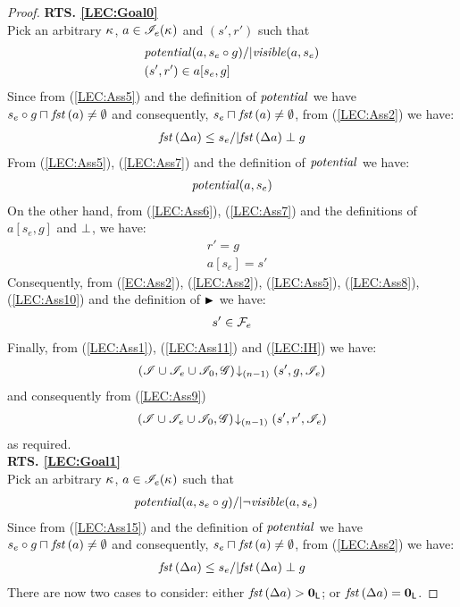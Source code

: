 \begin{lemma}
\begin{proof}
\noindent\textbf{RTS. \ref{LEC:Goal0}}\\
Pick an arbitrary $\kappa_{}$, $a \in \mathscr{I}_e(\kappa_{})$ and $(s', r')$ such that
%
\begin{align}
	& \mathit{potential}(a, s_e \circ g) /| \mathit{visible}(a, s_e) \label{LEC:Ass5}\\
	& (s', r') \in a[s_e, g] \label{LEC:Ass6}
\end{align}
Since from (\ref{LEC:Ass5}) and the definition of $\mathit{potential}$ we have $s_e \circ g \sqcap_{} \mathit{fst}\left(a\right) \not= \emptyset$ and consequently, $s_e \sqcap_{} \mathit{fst}\left(a\right) \not= \emptyset$, from (\ref{LEC:Ass2}) we have:
%
\begin{align}
	\mathit{fst}\left(\Delta {a}\right) \leq s_e /| \mathit{fst}\left(\Delta {a}\right) \mathrel{\bot} g\label{LEC:Ass7}
\end{align}
% 
From (\ref{LEC:Ass5}), (\ref{LEC:Ass7}) and the definition of $\mathit{potential}$ we have:
%
\begin{align}
	\mathit{potential}(a, s_e) \label{LEC:Ass8}
\end{align}
%
On the other hand, from (\ref{LEC:Ass6}), (\ref{LEC:Ass7}) and the definitions of $a[s_e, g]$ and $\mathrel{\bot}$, we have: 
%
\begin{align}
	& r' = g \label{LEC:Ass9}\\
	& a[s_e] = s' \label{LEC:Ass10}
\end{align}
%
Consequently, from (\ref{EC:Ass2}), (\ref{LEC:Ass2}), (\ref{LEC:Ass5}), (\ref{LEC:Ass8}), (\ref{LEC:Ass10}) and the definition of $\strictfences$ we have:
%
\begin{align}
	s' \in  \mathcal{F}_{e}  \label{LEC:Ass11}
\end{align}
%
Finally, from (\ref{LEC:Ass1}), (\ref{LEC:Ass11}) and (\ref{LEC:IH}) we have:
%
\begin{align*}
	\left(\mathscr{I} \cup \mathscr{I}_{e} \cup \mathscr{I}_0, \mathscr{G}\right) \!\downarrow_{(n-1)} \left(s', g, \mathscr{I}_e\right)
\end{align*}
%
and consequently from (\ref{LEC:Ass9})
%
\begin{align*}
	\left(\mathscr{I} \cup \mathscr{I}_{e} \cup \mathscr{I}_0, \mathscr{G}\right) \!\downarrow_{(n-1)} \left(s', r', \mathscr{I}_e\right)
\end{align*}
%
as required.\\
%
%
%

\noindent\textbf{RTS. \ref{LEC:Goal1}}\\
Pick an arbitrary $\kappa_{}$, $a \in \mathscr{I}_e(\kappa_{})$ such that
%
\begin{align}
	& \mathit{potential}(a, s_e \circ g) /| \neg\mathit{visible}(a, s_e) \label{LEC:Ass15}
\end{align}
Since from (\ref{LEC:Ass15}) and the definition of $\mathit{potential}$ we have $s_e \circ g \sqcap_{} \mathit{fst}\left(a\right) \not= \emptyset$ and consequently, $s_e \sqcap_{} \mathit{fst}\left(a\right) \not= \emptyset$, from (\ref{LEC:Ass2}) we have:
%
\begin{align}
	\mathit{fst}\left(\Delta {a}\right) \leq s_e /| \mathit{fst}\left(\Delta {a}\right) \mathrel{\bot} g \label{LEC:Ass16}
\end{align}
% 
There are now two cases to consider: either $\mathit{fst}\left(\Delta {a}\right) > \mathbf{0}_{\textsf{L}}$; or $\mathit{fst}\left(\Delta {a}\right) = \mathbf{0}_{\textsf{L}}$.


\end{proof}
\end{lemma}
